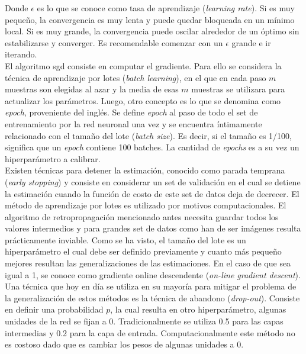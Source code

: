 \indent Donde $\epsilon$ es lo que se conoce como tasa de aprendizaje (\textit{learning rate}). Si es muy pequeño,
la convergencia es muy lenta y puede quedar bloqueada en un mínimo local. Si es muy grande, la convergencia puede
oscilar alrededor de un óptimo sin estabilizarse y converger. Es recomendable comenzar con un $\epsilon$ grande e ir
iterando. \\
\indent El algoritmo \acrshort{sgd} consiste en computar el gradiente. Para ello se considera la técnica de
aprendizaje por lotes (\textit{batch learning}), en el que en cada paso $m$ muestras son elegidas al azar y la media
de esas $m$ muestras se utilizara para actualizar los parámetros. Luego, otro concepto es lo que se denomina como
\textit{epoch}, proveniente del inglés. Se define \textit{epoch} al paso de todo el set de entrenamiento por la red
neuronal una vez y se encuentra íntimamente relacionado con el tamaño del lote (\textit{batch size}). Es decir, si
el tamaño es 1/100, significa que un \textit{epoch} contiene 100 batches. La cantidad de \textit{epochs} es a su vez
un hiperparámetro a calibrar. \\
\indent Existen técnicas para detener la estimación, conocido como parada temprana (\textit{early stopping}) y
consiste en considerar un set de validación en el cual se detiene la estimación cuando la función de costo de este
set de datos deja de decrecer. El método de aprendizaje por lotes es utilizado por motivos computacionales. El
algoritmo de retropropagación mencionado antes necesita guardar todos los valores intermedios y para grandes set de
datos como han de ser imágenes resulta prácticamente inviable. Como se ha visto, el tamaño del lote es un
hiperparámetro el cual debe ser definido previamente y cuanto más pequeño mejores resultan las generalizaciones de
las estimaciones. En el caso de que sea igual a 1, se conoce como gradiente online descendente (\textit{on-line
gradient descent}). \\
\indent Una técnica que hoy en día se utiliza en su mayoría para mitigar el problema de la generalización de estos
métodos es la técnica de abandono (\textit{drop-out}). Consiste en definir una probabilidad $p$, la cual resulta en
otro hiperparámetro, algunas unidades de la red se fijan a 0. Tradicionalmente se utiliza 0.5 para las capas
intermedias y 0.2 para la capa de entrada. Computacionalmente este método no es costoso dado que es cambiar los
pesos de algunas unidades a 0.


